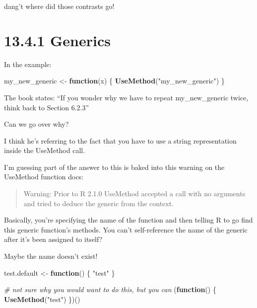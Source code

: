 \documentclass[]{book}
\newenvironment{Shaded}{\begin{snugshade}}{\end{snugshade}}
\newcommand{\CommentTok}[1]{\textcolor[rgb]{0.56,0.35,0.01}{\textit{#1}}}
\newcommand{\ControlFlowTok}[1]{\textcolor[rgb]{0.13,0.29,0.53}{\textbf{#1}}}
\newcommand{\KeywordTok}[1]{\textcolor[rgb]{0.13,0.29,0.53}{\textbf{#1}}}
\newcommand{\NormalTok}[1]{#1}
\newcommand{\StringTok}[1]{\textcolor[rgb]{0.31,0.60,0.02}{#1}}
\begin{document}
dang't where did those contrasts go!

\hypertarget{generics}{%
\section*{13.4.1 Generics}\label{generics}}

In the example:

\begin{Shaded}
\begin{Highlighting}[]
\NormalTok{my_new_generic <-}\StringTok{ }\ControlFlowTok{function}\NormalTok{(x) \{}
  \KeywordTok{UseMethod}\NormalTok{(}\StringTok{"my_new_generic"}\NormalTok{)}
\NormalTok{\}}
\end{Highlighting}
\end{Shaded}

The book states: ``If you wonder why we have to repeat my\_new\_generic twice, think back to Section 6.2.3''

Can we go over why?

I think he's referring to the fact that you have to use a string representation inside the UseMethod call.

I'm guessing part of the answer to this is baked into this warning on the UseMethod function docs:

\begin{quote}
Warning: Prior to R 2.1.0 UseMethod accepted a call with no arguments and tried to deduce the generic from the context.
\end{quote}

Basically, you're specifying the name of the function and then telling R to go find this generic function's methods. You can't self-reference the name of the generic after it's been assigned to itself?

Maybe the name doesn't exist!

\begin{Shaded}
\begin{Highlighting}[]
\NormalTok{test.default <-}\StringTok{ }\ControlFlowTok{function}\NormalTok{() \{}
  \StringTok{"test"}
\NormalTok{\}}

\CommentTok{# not sure why you would want to do this, but you can}
\NormalTok{(}\ControlFlowTok{function}\NormalTok{() \{}
  \KeywordTok{UseMethod}\NormalTok{(}\StringTok{"test"}\NormalTok{)}
\NormalTok{\})()}
\end{Highlighting}
\end{Shaded}
\end{document}
